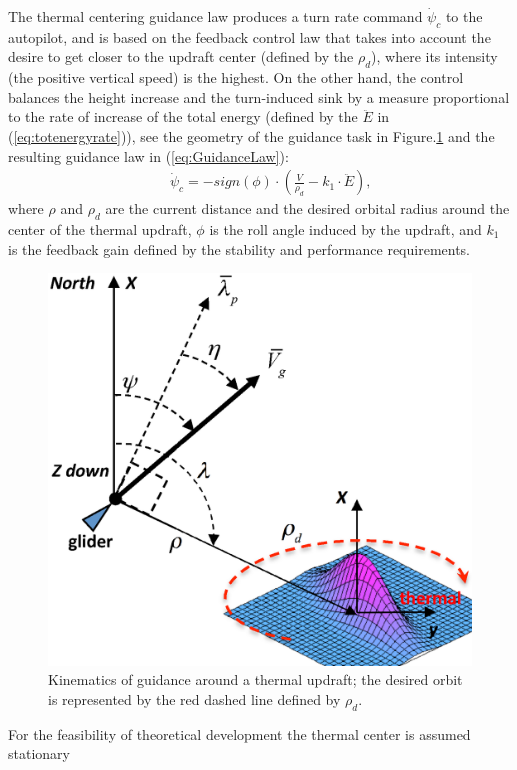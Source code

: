 \documentclass{ifacconf}
\begin{document}
The thermal centering guidance law produces a turn rate command $\dot{\psi}_{c}$ to the
autopilot, and is based on the feedback control law that takes into account the desire to
get closer to the updraft center (defined by the $\rho_d$), where its intensity (the
positive vertical speed) is the highest. On the other hand, the control balances the
height increase and the turn-induced sink by a measure proportional to the rate of
increase of the total energy (defined by the $\ddot{E}$ in (\ref{eq:totenergyrate})), see
the geometry of the guidance task in Figure.\ref{fig:ThermaG} and the resulting guidance
law in (\ref{eq:GuidanceLaw}):
\begin{eqnarray}
    && \dot{\psi}_{c}=-sign(\phi) \cdot (\frac{V}{\rho_d}-k_1 \cdot \ddot{E}),
    \label{eq:GuidanceLaw}
\end{eqnarray}
where $\rho$ and $\rho_d$ are the current distance and the desired orbital radius around
the center of the thermal updraft, $\phi$ is the roll angle induced by the updraft, and
$k_1$ is the feedback gain defined by the stability and performance requirements.
\begin{figure}[thpb]
  \centering
  \includegraphics[scale=0.3]{Figures/ThermalG.eps}
  \caption{Kinematics of guidance around a thermal updraft; the desired orbit is represented by the
  red dashed line defined by $\rho_d$.}
  \label{fig:ThermaG}
\end{figure}
For the feasibility of theoretical development the thermal center is assumed stationary
\end{document}
